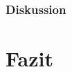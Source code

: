 \documentclass[12pt,a4paper]{article}
\begin{document}
\subsubsection*{Diskussion}
\section{Fazit}
\end{document}
